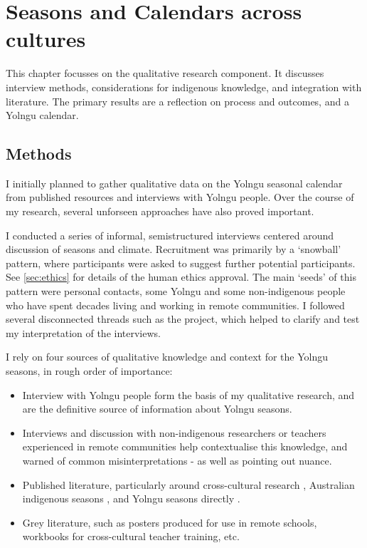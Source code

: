 \chapter{Seasons and Calendars across cultures}
\label{ch:seasons}

This chapter focusses on the qualitative research component.
It discusses interview methods, considerations for indigenous knowledge, and integration with literature.
The primary results are a reflection on process and outcomes, and a Yolngu calendar.


\section{Methods}

I initially planned to gather qualitative data on the Yolngu seasonal calendar
from published resources and interviews with Yolngu people.
Over the course of my research, several unforseen approaches have also proved important.

I conducted a series of informal, semistructured interviews centered around discussion of seasons and climate.
Recruitment was primarily by a `snowball' pattern, where participants were asked to
suggest further potential participants.
See \autoref{sec:ethics} for details of the human ethics approval.
The main `seeds' of this pattern were personal contacts, some Yolngu and some non-indigenous
people who have spent decades living and working in remote communities.
I followed several disconnected threads such as the \citet{CSIROcals} project,
which helped to clarify and test my interpretation of the interviews.

I rely on four sources of qualitative knowledge and context for the Yolngu seasons, in rough order of importance:

\begin{itemize}
\item Interview with Yolngu people form the basis of my qualitative research, and
        are the definitive source of information about Yolngu seasons.
\item Interviews and discussion with non-indigenous researchers or teachers experienced
        in remote communities help contextualise this knowledge, and warned of
        common misinterpretations - as well as pointing out nuance.
\item Published literature, particularly around cross-cultural research \citep[eg.][]{smith1999},
        Australian indigenous seasons \citep[eg.][]{prober2011,oconnor2010}, and Yolngu
        seasons directly \citep{davis1989}.
\item Grey literature, such as posters produced for use in remote schools, workbooks
        for cross-cultural teacher training, etc.
\end{itemize}

